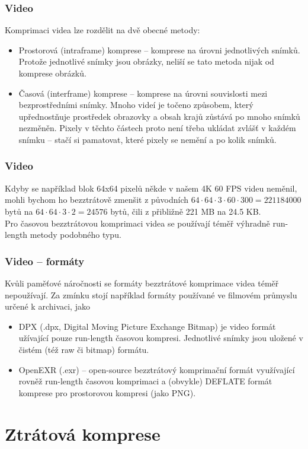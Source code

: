 \documentclass[aspectratio=169,11pt,svgnames]{beamer}
\begin{document}
\begin{frame}
 \frametitle{Video}
 Komprimaci videa lze rozdělit na dvě obecné metody:
 \begin{itemize}[label=\textbullet]
  \item \alert{Prostorová} (intraframe) komprese -- komprese na úrovni
   jednotlivých snímků. Protože jednotlivé snímky jsou obrázky, neliší se tato
   metoda nijak od komprese obrázků.
  \pause
 \item \alert{Časová} (interframe) komprese -- komprese na úrovni souvislosti
  mezi bezprostředními snímky. Mnoho videí je točeno způsobem, který
  upřednostňuje prostředek obrazovky a obsah krajů zůstává po mnoho snímků
  nezměněn. \pause
  Pixely v těchto částech proto není třeba ukládat zvlášť v každém snímku --
  stačí si pamatovat, které pixely se nemění a po kolik snímků.
 \end{itemize}
\end{frame}

\begin{frame}
 \frametitle{Video}
 Kdyby se například blok 64x64 pixelů někde v našem 4K 60 FPS videu neměnil,
 mohli bychom ho bezztrátově zmenšit z původních $64 \cdot 64 \cdot 3 \cdot 60
 \cdot 300 = 221184000$ bytů na $64 \cdot 64 \cdot 3 \cdot 2 = 24576$ bytů, čili
 z přibližně 221 MB na 24.5 KB.\pause\\
 Pro \alert{časovou} bezztrátovou komprimaci videa se používají téměř výhradně
 run-length metody podobného typu.
\end{frame}

\begin{frame}
 \frametitle{Video -- formáty}
 Kvůli paměťové náročnosti se formáty bezztrátové komprimace videa téměř
 nepoužívají. \pause Za zmínku stojí například formáty používané ve filmovém
 průmyslu určené k archivaci, jako
 \begin{itemize}[label=\textbullet]
  \item \alert{DPX} (.dpx, Digital Moving Picture Exchange Bitmap) je video
   formát užívající pouze run-length časovou kompresi. Jednotlivé snímky jsou
   uložené v čistém (též raw či bitmap) formátu.
   \pause
  \item \alert{OpenEXR} (.exr) -- open-source bezztrátový komprimační formát
   využívající rovněž run-length časovou komprimaci a (obvykle) DEFLATE formát
   komprese pro prostorovou kompresi (jako PNG).
 \end{itemize}
\end{frame}

\section{Ztrátová komprese}
\label{sec:ztratova-komprese}
\end{document}
